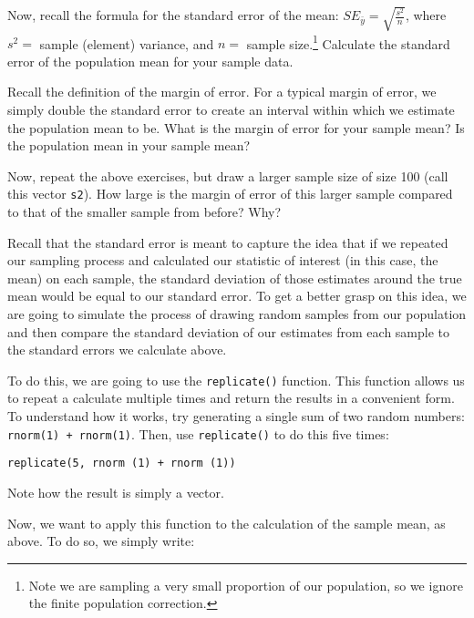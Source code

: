 \documentclass[a4paper,12pt]{article}
\begin{document}
\begin{enumerate*}
\item Now, recall the formula for the standard error of the mean: $SE_{\bar{y}} = \sqrt{\frac{s^2}{n}}$, where $s^2 = $ sample (element) variance, and	$n = $ sample size.\footnote{Note we are sampling a very small proportion of our population, so we ignore the finite population correction.} Calculate the standard error of the population mean for your sample data.

\item Recall the definition of the margin of error. For a typical margin of error, we simply double the standard error to create an interval within which we estimate the population mean to be. What is the margin of error for your sample mean? Is the population mean in your sample mean?

\item Now, repeat the above exercises, but draw a larger sample size of size 100 (call this vector \texttt{s2}). How large is the margin of error of this larger sample compared to that of the smaller sample from before? Why?

\item Recall that the standard error is meant to capture the idea that if we repeated our sampling process and calculated our statistic of interest (in this case, the mean) on each sample, the standard deviation of those estimates around the true mean would be equal to our standard error. To get a better grasp on this idea, we are going to simulate the process of drawing random samples from our population and then compare the standard deviation of our estimates from each sample to the standard errors we calculate above.

\item To do this, we are going to use the \texttt{replicate()} function. This function allows us to repeat a calculate multiple times and return the results in a convenient form. To understand how it works, try generating a single sum of two random numbers: \texttt{rnorm(1) + rnorm(1)}. Then, use \texttt{replicate()} to do this five times:

\begin{verbatim}
replicate(5, rnorm (1) + rnorm (1))
\end{verbatim}

\noindent Note how the result is simply a vector.

\item Now, we want to apply this function to the calculation of the sample mean, as above. To do so, we simply write:


\end{enumerate*}
\end{document}
